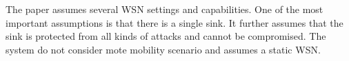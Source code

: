 \documentclass[conference]{IEEEtran}
\newcommand{\notedme}[1]{\raisebox{0pt}[0pt][0pt]{\pdfcomment[open=true,color=blue]{#1}}}
\begin{document}



The paper assumes several WSN settings and capabilities.
One of the most important assumptions is that there is a single  sink. 
It further assumes that the sink is protected from all kinds of attacks and cannot be compromised. 
The system do not consider mote mobility scenario and assumes a static WSN.


\end{document}
